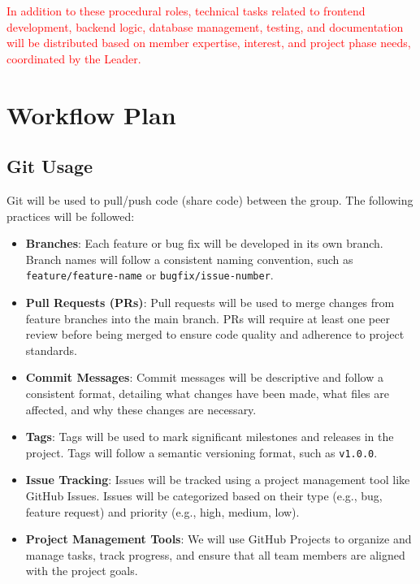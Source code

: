\documentclass{article}
\begin{document}
\textcolor{red}{In addition to these procedural roles, technical tasks related to frontend development, backend logic, database management, testing, and documentation will be distributed based on member expertise, interest, and project phase needs, coordinated by the Leader.}

\section{Workflow Plan}

\subsection{Git Usage}
Git will be used to pull/push code (share code) between the group. The following practices will be followed:
\begin{itemize}
  \item \textbf{Branches}: Each feature or bug fix will be developed in its own branch. Branch names will follow a consistent naming convention, such as \texttt{feature/feature-name} or \texttt{bugfix/issue-number}.
  \item \textbf{Pull Requests (PRs)}: Pull requests will be used to merge changes from feature branches into the main branch. PRs will require at least one peer review before being merged to ensure code quality and adherence to project standards.
  \item \textbf{Commit Messages}: Commit messages will be descriptive and follow a consistent format, detailing what changes have been made, what files are affected, and why these changes are necessary.
  \item \textbf{Tags}: Tags will be used to mark significant milestones and releases in the project. Tags will follow a semantic versioning format, such as \texttt{v1.0.0}.
  \item \textbf{Issue Tracking}: Issues will be tracked using a project management tool like GitHub Issues. Issues will be categorized based on their type (e.g., bug, feature request) and priority (e.g., high, medium, low).
  \item \textbf{Project Management Tools}: We will use GitHub Projects to organize and manage tasks, track progress, and ensure that all team members are aligned with the project goals.
\end{itemize}
\end{document}
